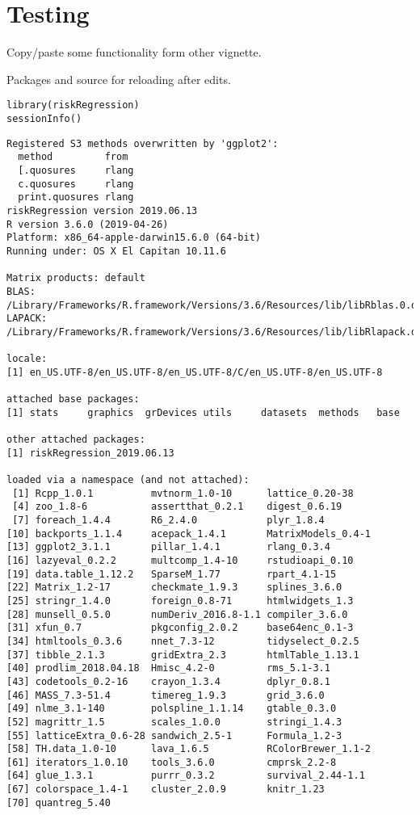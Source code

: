 \documentclass{article}
\begin{document}
\section{Testing}
\label{sec:org3fe00db}
Copy/paste some functionality form other vignette.

Packages and source for reloading after edits.
\lstset{language=r,label= ,caption= ,captionpos=b,numbers=none}
\begin{lstlisting}
library(riskRegression)
sessionInfo()
\end{lstlisting}

\begin{verbatim}
Registered S3 methods overwritten by 'ggplot2':
  method         from
  [.quosures     rlang
  c.quosures     rlang
  print.quosures rlang
riskRegression version 2019.06.13
R version 3.6.0 (2019-04-26)
Platform: x86_64-apple-darwin15.6.0 (64-bit)
Running under: OS X El Capitan 10.11.6

Matrix products: default
BLAS:   /Library/Frameworks/R.framework/Versions/3.6/Resources/lib/libRblas.0.dylib
LAPACK: /Library/Frameworks/R.framework/Versions/3.6/Resources/lib/libRlapack.dylib

locale:
[1] en_US.UTF-8/en_US.UTF-8/en_US.UTF-8/C/en_US.UTF-8/en_US.UTF-8

attached base packages:
[1] stats     graphics  grDevices utils     datasets  methods   base

other attached packages:
[1] riskRegression_2019.06.13

loaded via a namespace (and not attached):
 [1] Rcpp_1.0.1          mvtnorm_1.0-10      lattice_0.20-38
 [4] zoo_1.8-6           assertthat_0.2.1    digest_0.6.19
 [7] foreach_1.4.4       R6_2.4.0            plyr_1.8.4
[10] backports_1.1.4     acepack_1.4.1       MatrixModels_0.4-1
[13] ggplot2_3.1.1       pillar_1.4.1        rlang_0.3.4
[16] lazyeval_0.2.2      multcomp_1.4-10     rstudioapi_0.10
[19] data.table_1.12.2   SparseM_1.77        rpart_4.1-15
[22] Matrix_1.2-17       checkmate_1.9.3     splines_3.6.0
[25] stringr_1.4.0       foreign_0.8-71      htmlwidgets_1.3
[28] munsell_0.5.0       numDeriv_2016.8-1.1 compiler_3.6.0
[31] xfun_0.7            pkgconfig_2.0.2     base64enc_0.1-3
[34] htmltools_0.3.6     nnet_7.3-12         tidyselect_0.2.5
[37] tibble_2.1.3        gridExtra_2.3       htmlTable_1.13.1
[40] prodlim_2018.04.18  Hmisc_4.2-0         rms_5.1-3.1
[43] codetools_0.2-16    crayon_1.3.4        dplyr_0.8.1
[46] MASS_7.3-51.4       timereg_1.9.3       grid_3.6.0
[49] nlme_3.1-140        polspline_1.1.14    gtable_0.3.0
[52] magrittr_1.5        scales_1.0.0        stringi_1.4.3
[55] latticeExtra_0.6-28 sandwich_2.5-1      Formula_1.2-3
[58] TH.data_1.0-10      lava_1.6.5          RColorBrewer_1.1-2
[61] iterators_1.0.10    tools_3.6.0         cmprsk_2.2-8
[64] glue_1.3.1          purrr_0.3.2         survival_2.44-1.1
[67] colorspace_1.4-1    cluster_2.0.9       knitr_1.23
[70] quantreg_5.40
\end{verbatim}
\end{document}
